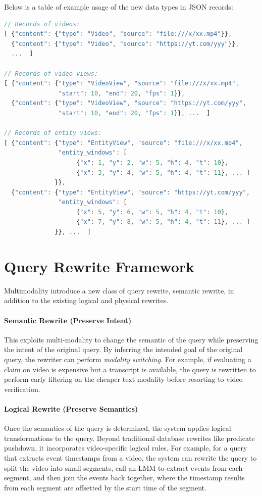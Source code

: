 \documentclass[sigconf,nonacm,screen]{acmart}
\begin{document}
Below is a table of example usage of the new data types in JSON records:
\begin{lstlisting}[language=JavaScript, basicstyle=\footnotesize\ttfamily, showstringspaces=false, breaklines=true, columns=fullflexible, keepspaces=true, frame=single]
// Records of videos:
[ {"content": {"type": "Video", "source": "file:///x/xx.mp4"}},
  {"content": {"type": "Video", "source": "https://yt.com/yyy"}},
  ...  ]

// Records of video views:
[ {"content": {"type": "VideoView", "source": "file:///x/xx.mp4",
               "start": 10, "end": 20, "fps": 1}},
  {"content": {"type": "VideoView", "source": "https://yt.com/yyy",
               "start": 10, "end": 20, "fps": 1}}, ...  ]

// Records of entity views:
[ {"content": {"type": "EntityView", "source": "file:///x/xx.mp4",
               "entity_windows": [
                    {"x": 1, "y": 2, "w": 5, "h": 4, "t": 10},
                    {"x": 3, "y": 4, "w": 5, "h": 4, "t": 11}, ... ]
              }},
  {"content": {"type": "EntityView", "source": "https://yt.com/yyy",
               "entity_windows": [
                    {"x": 5, "y": 6, "w": 5, "h": 4, "t": 10},
                    {"x": 7, "y": 8, "w": 5, "h": 4, "t": 11}, ... ]
              }}, ...  ]
\end{lstlisting}

\section{Query Rewrite Framework}
Multimodality introduce a new class of query rewrite, semantic rewrite, in addition to the existing logical and physical rewrites.

\paragraph{Semantic Rewrite (Preserve Intent)}
This exploits multi-modality to change the semantic of the query while preserving the intent of the original query.
By inferring the intended goal of the original query, the rewriter can perform \textit{modality switching}. 
For example, if evaluating a claim on video is expensive but a transcript is available, 
the query is rewritten to perform early filtering on the cheaper text modality before resorting to video verification.

\paragraph{Logical Rewrite (Preserve Semantics)}
Once the semantics of the query is determined, the system applies logical transformations to the query.
Beyond traditional database rewrites like predicate pushdown, 
it incorporates video-specific logical rules. 
For example, for a query that extracts event timestamps from a video,
the system can rewrite the query to split the video into small segments,
call an LMM to extract events from each segment,
and then join the events back together, where the timestamp results from each segment are offsetted by the start time of the segment.
\end{document}
